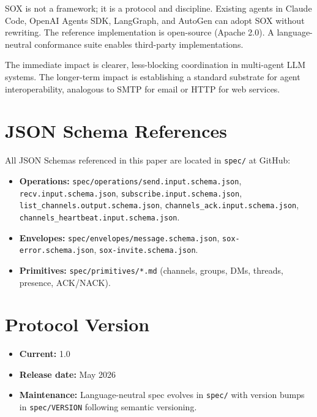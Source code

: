 \documentclass[11pt]{article}
\begin{document}
SOX is not a framework; it is a protocol and discipline. Existing agents in Claude Code, OpenAI Agents SDK, LangGraph, and AutoGen can adopt SOX without rewriting. The reference implementation is open-source (Apache 2.0). A language-neutral conformance suite enables third-party implementations.

The immediate impact is clearer, less-blocking coordination in multi-agent LLM systems. The longer-term impact is establishing a standard substrate for agent interoperability, analogous to SMTP for email or HTTP for web services.




\appendix

\section{JSON Schema References}

All JSON Schemas referenced in this paper are located in \texttt{spec/} at GitHub:

\begin{itemize}
  \item \textbf{Operations:} \texttt{spec/operations/send.input.schema.json}, \texttt{recv.input.schema.json}, \texttt{subscribe.input.schema.json}, \texttt{list\_channels.output.schema.json}, \texttt{channels\_ack.input.schema.json}, \texttt{channels\_heartbeat.input.schema.json}.
  \item \textbf{Envelopes:} \texttt{spec/envelopes/message.schema.json}, \texttt{sox-error.schema.json}, \texttt{sox-invite.schema.json}.
  \item \textbf{Primitives:} \texttt{spec/primitives/*.md} (channels, groups, DMs, threads, presence, ACK/NACK).
\end{itemize}

\section{Protocol Version}

\begin{itemize}
  \item \textbf{Current:} 1.0
  \item \textbf{Release date:} May 2026
  \item \textbf{Maintenance:} Language-neutral spec evolves in \texttt{spec/} with version bumps in \texttt{spec/VERSION} following semantic versioning.
\end{itemize}
\end{document}
